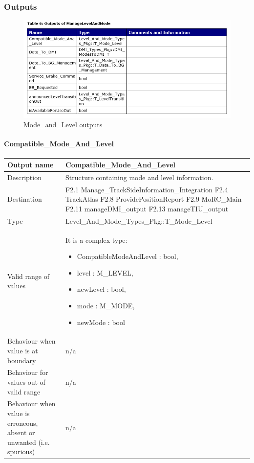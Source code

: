 \subsubsection{Outputs}\label{s:mode_and_level_outputs}

\begin{figure}
\center
\includegraphics[width=\textwidth]{images/Outputs_ML.png}
\caption{Mode\_and\_Level outputs}\label{f:mode_and_level_outputs}
\end{figure}



\paragraph{Compatible\_Mode\_And\_Level}

\begin{longtable}{p{}p{}}
\toprule
Output name				& Compatible\_Mode\_And\_Level \\
\midrule
Description				& Structure containing mode and level information.  \\
\midrule
Destination				& F2.1 Manage\_TrackSideInformation\_Integration\newline
F2.4 TrackAtlas\newline
F2.8 ProvidePositionReport\newline
F2.9 MoRC\_Main\newline
F2.11 manageDMI\_output\newline 
F2.13 manageTIU\_output \\ 
\midrule
Type					& Level\_And\_Mode\_Types\_Pkg::T\_Mode\_Level \\
\midrule
Valid range of values	& It is a complex type: 
\begin{itemize}
\item CompatibleModeAndLevel : bool,
\item level : M\_LEVEL,
\item newLevel : bool,
\item mode : M\_MODE, 
\item newMode : bool
\end{itemize} \\
\midrule
Behaviour when value is at boundary	& n/a \\ 
\midrule
Behaviour for values out of valid range	& n/a \\ 
\midrule
Behaviour when value is erroneous, absent or unwanted (i.e. spurious) & n/a \\
\bottomrule
\end{longtable}

